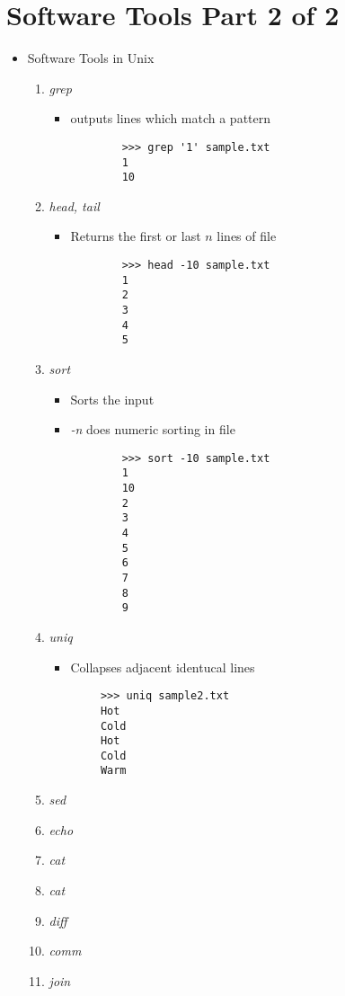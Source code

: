 \documentclass[12pt]{article}
\begin{document}
\section*{Software Tools Part 2 of 2}
\begin{itemize}
    \item Software Tools in Unix
    \begin{enumerate}[1.]
        \item \textit{grep}
        \begin{itemize}
        \item outputs lines which match a pattern

        \begin{lstlisting}
        >>> grep '1' sample.txt
        1
        10
        \end{lstlisting}
        \end{itemize}

        \item \textit{head, tail}
        \begin{itemize}
        \item Returns the first or last $n$ lines of file

        \begin{lstlisting}
        >>> head -10 sample.txt
        1
        2
        3
        4
        5
        \end{lstlisting}

        \end{itemize}

        \item \textit{sort}
        \begin{itemize}
            \item Sorts the input
            \item \textit{-n} does numeric sorting in file
        \begin{lstlisting}
        >>> sort -10 sample.txt
        1
        10
        2
        3
        4
        5
        6
        7
        8
        9
        \end{lstlisting}

        \end{itemize}
        \item \textit{uniq}
        \begin{itemize}
            \item Collapses adjacent identucal lines
        \end{itemize}
        \begin{lstlisting}
        >>> uniq sample2.txt
        Hot
        Cold
        Hot
        Cold
        Warm
        \end{lstlisting}
        \item \textit{sed}
        \item \textit{echo}
        \item \textit{cat}
        \item \textit{cat}
        \item \textit{diff}
        \item \textit{comm}
        \item \textit{join}
    \end{enumerate}
\end{itemize}
\end{document}
